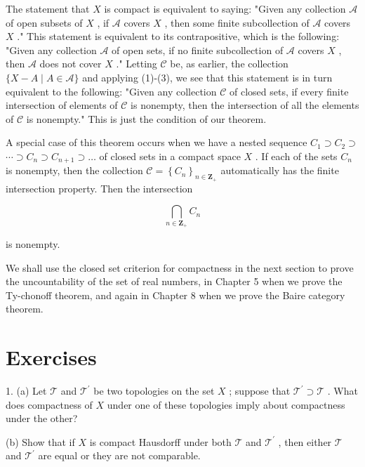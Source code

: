 The statement that \(X\) is compact is equivalent to saying: "Given any collection \(\mathcal{A}\) of open subsets of \(X\) , if \(\mathcal{A}\) covers \(X\) , then some finite subcollection of \(\mathcal{A}\) covers \(X\) ." This statement is equivalent to its contrapositive, which is the following: "Given any collection \(\mathcal{A}\) of open sets, if no finite subcollection of \(\mathcal{A}\) covers \(X\) , then \(\mathcal{A}\) does not cover \(X\) ." Letting \(\mathcal{C}\) be, as earlier, the collection \(\{ X - A \mid  A \in  \mathcal{A}\}\) and applying (1)-(3), we see that this statement is in turn equivalent to the following: "Given any collection \(\mathcal{C}\) of closed sets, if every finite intersection of elements of \(\mathcal{C}\) is nonempty, then the intersection of all the elements of \(\mathcal{C}\) is nonempty." This is just the condition of our theorem.

A special case of this theorem occurs when we have a nested sequence \({C}_{1} \supset  {C}_{2} \supset\)  \(\cdots  \supset  {C}_{n} \supset  {C}_{n + 1} \supset  \ldots\) of closed sets in a compact space \(X\) . If each of the sets \({C}_{n}\) is nonempty, then the collection \(\mathcal{C} = {\left\{  {C}_{n}\right\}  }_{n \in  {\mathbf{Z}}_{ + }}\) automatically has the finite intersection property. Then the intersection

\[
\mathop{\bigcap }\limits_{{n \in  {\mathbf{Z}}_{ + }}}{C}_{n}
\]

is nonempty.

We shall use the closed set criterion for compactness in the next section to prove the uncountability of the set of real numbers, in Chapter 5 when we prove the Ty-chonoff theorem, and again in Chapter 8 when we prove the Baire category theorem.

\section*{Exercises}

1. (a) Let \(\mathcal{T}\) and \({\mathcal{T}}^{\prime }\) be two topologies on the set \(X\) ; suppose that \({\mathcal{T}}^{\prime } \supset  \mathcal{T}\) . What does compactness of \(X\) under one of these topologies imply about compactness under the other?

(b) Show that if \(X\) is compact Hausdorff under both \(\mathcal{T}\) and \({\mathcal{T}}^{\prime }\) , then either \(\mathcal{T}\) and \({\mathcal{T}}^{\prime }\) are equal or they are not comparable.


